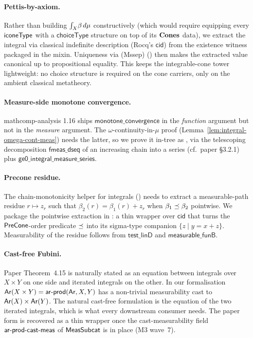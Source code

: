 \paragraph{Pettis-by-axiom.}
Rather than building $\int_{X}\!\beta\,d\mu$ constructively (which
would require equipping every $\mathsf{iconeType}$ with a $\mathsf{choiceType}$
structure on top of its $\mathbf{Cones}$ data), we extract the integral via
classical indefinite description (Rocq's $\mathsf{cid}$) from the
existence witness packaged in the
 mixin. Uniqueness via
(Mssep) () then
makes the extracted value canonical up to propositional equality.
This keeps the integrable-cone tower lightweight: no choice
structure is required on the cone carriers, only on the ambient
classical metatheory.

\paragraph{Measure-side monotone convergence.}
mathcomp-analysis 1.16 ships $\mathsf{monotone\_convergence}$ in
the \emph{function} argument but not in the \emph{measure}
argument. The $\omega$-continuity-in-$\mu$ proof
(Lemma~\ref{lem:integral-omega-cont-meas}) needs the latter, so we
prove it in-tree as
, via the
telescoping decomposition $\mathsf{fmeas\_dseq}$ of an increasing
chain into a series (cf.\ paper \S3.2.1) plus
$\mathsf{ge0\_integral\_measure\_series}$.

\paragraph{Precone residue.}
The chain-monotonicity helper for integrals
()
needs to extract a measurable-path residue $r \mapsto z_r$ such that
$\beta_2(r) = \beta_1(r) + z_r$ when $\beta_1 \preceq \beta_2$
pointwise. We package the pointwise extraction in
: a thin wrapper
over $\mathsf{cid}$ that turns the $\mathsf{PreCone}$-order predicate
$\preceq$ into its sigma-type companion $\{z \mid y = x + z\}$.
Measurability of the residue follows from $\mathsf{test\_linD}$ and
$\mathsf{measurable\_funB}$.

\paragraph{Cast-free Fubini.}
Paper Theorem~4.15 is naturally stated as an equation between
integrals over $X \times Y$ on one side and iterated integrals on
the other. In our formalisation $\mathsf{Ar}(X \times Y) =
\mathsf{ar}\text{-}\mathsf{prod}(\mathsf{Ar}, X, Y)$ has a non-trivial
measurability cast to $\mathsf{Ar}(X) \times \mathsf{Ar}(Y)$. The natural
cast-free formulation
 is the equation of the
two iterated integrals, which is what every downstream consumer
needs. The paper form
 is recovered as a
thin wrapper once the cast-measurability field
$\mathsf{ar}\text{-}\mathsf{prod\text{-}cast\text{-}meas}$ of $\mathsf{MeasSubcat}$
is in place (M3 wave~7).
